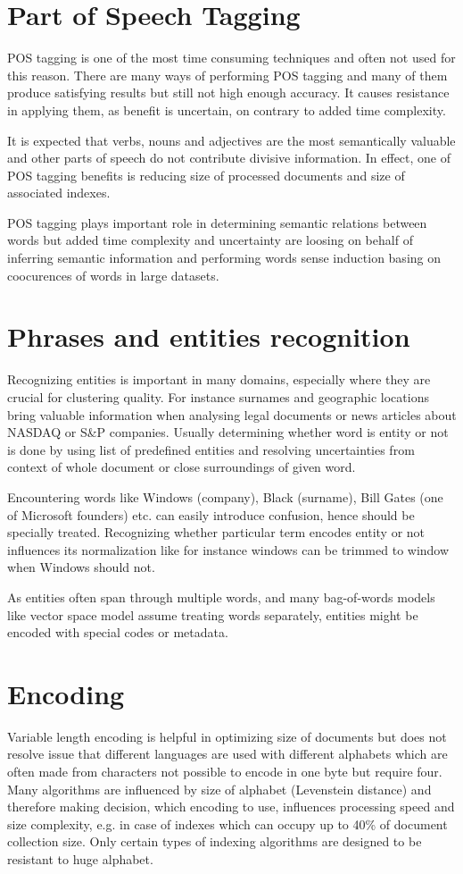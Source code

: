 \documentclass[a4paper, 12pt, oneside]{Thesis} %
\begin{document}
\section{Part of Speech Tagging} POS tagging is one of the most time consuming techniques and often not used for this reason. There are many ways of performing POS tagging and many of them produce satisfying results but still not high enough accuracy. It causes resistance in applying them, as benefit is uncertain, on contrary to added time complexity.

It is expected that verbs, nouns and adjectives are the most semantically valuable and other parts of speech do not contribute divisive information. In effect, one of POS tagging benefits is reducing size of processed documents and size of associated indexes.

POS tagging plays important role in determining semantic relations between words but added time complexity and uncertainty are loosing on behalf of inferring semantic information and performing words sense induction basing on coocurences of words in large datasets.

\section{Phrases and entities recognition} Recognizing entities is important in many domains, especially where they are crucial for clustering quality. For instance surnames and geographic locations bring valuable information when analysing legal documents or news articles about NASDAQ or S\&P companies. Usually determining whether word is entity or not is done by using list of predefined entities and resolving uncertainties from context of whole document or close surroundings of given word.

Encountering words like Windows (company), Black (surname), Bill Gates (one of Microsoft founders) etc. can easily introduce confusion, hence should be specially treated. Recognizing whether particular term encodes entity or not influences its normalization like for instance windows can be trimmed to window when Windows should not.

As entities often span through multiple words, and many bag-of-words models like vector space model assume treating words separately, entities might be encoded with special codes or metadata.

\section{Encoding} Variable length encoding is helpful in optimizing size of documents but does not resolve issue that different languages are used with different alphabets which are often made from characters not possible to encode in one byte but require four. Many algorithms are influenced by size of alphabet (Levenstein distance) and therefore making decision, which encoding to use, influences processing speed and size complexity, e.g. in case of indexes which can occupy up to 40\% of document collection size. Only certain types of indexing algorithms are designed to be resistant to huge alphabet.
\end{document}
